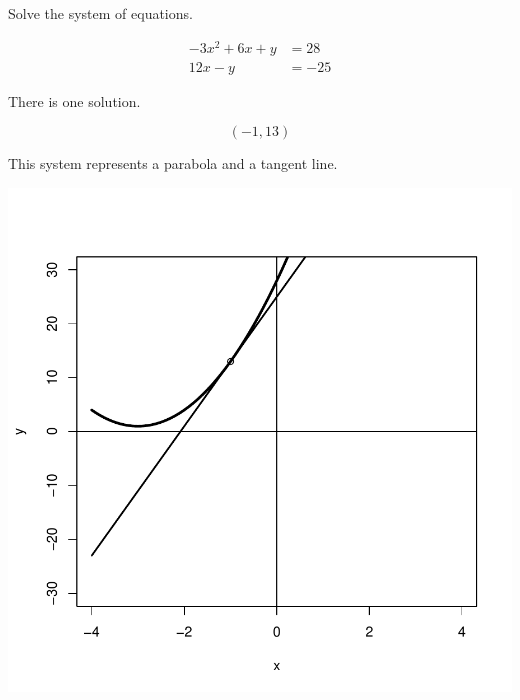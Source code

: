 
\begin{question}
Solve the system of equations.

\[\begin{aligned}
- 3 x^{2} + 6 x + y &= 28 \\
12 x - y &= -25
\end{aligned}\]
\end{question}

\begin{solution}
There is one solution.

\[(-1,13)\]

This system represents a parabola and a tangent line.

\includegraphics{unnamed-chunk-2-1-2.pdf}\\
\end{solution}

